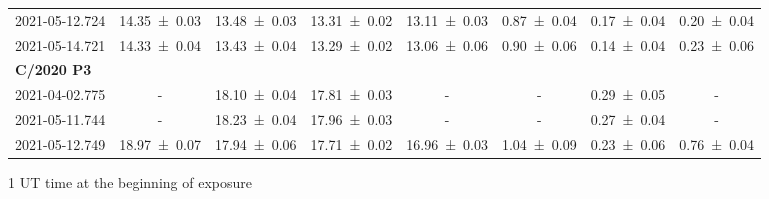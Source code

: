 \begin{table}
\begin{threeparttable}
{\begin{tabular}{cccccccc}
            2021-05-12.724 & \num{14.35 +- 0.03} & \num{13.48 +- 0.03} & \num{13.31 +- 0.02} & \num{13.11 +- 0.03} & \num{0.87 +- 0.04} & \num{0.17 +- 0.04} & \num{0.20 +- 0.04} \\
            2021-05-14.721 & \num{14.33 +- 0.04} & \num{13.43 +- 0.04} & \num{13.29 +- 0.02} & \num{13.06 +- 0.06} & \num{0.90 +- 0.06} & \num{0.14 +- 0.04} & \num{0.23 +- 0.06} \\
            \multicolumn{8}{l}{\textbf{C/2020 P3}} \\
            2021-04-02.775 & - & \num{18.10 +- 0.04} & \num{17.81 +- 0.03} & - & - & \num{0.29 +- 0.05} & - \\
            2021-05-11.744 & - & \num{18.23 +- 0.04} & \num{17.96 +- 0.03} & - & - & \num{0.27 +- 0.04} & - \\
            2021-05-12.749 & \num{18.97 +- 0.07} & \num{17.94 +- 0.06} & \num{17.71 +- 0.02} & \num{16.96 +- 0.03} & \num{1.04 +- 0.09} & \num{0.23 +- 0.06} & \num{0.76 +- 0.04} \\
            \bottomrule
        \end{tabular}
        }
        \begin{tablenotes}
            \item[1] UT time at the beginning of exposure
        \end{tablenotes}
    \end{threeparttable}
\end{table}


